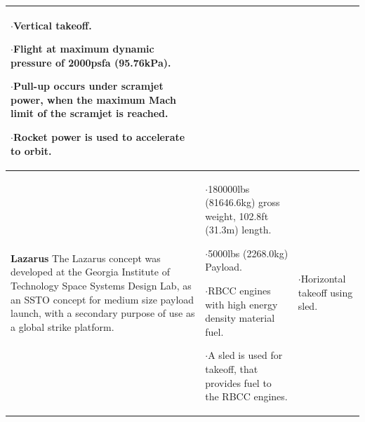 {\begin{landscape}
\begin{xltabular}{\linewidth}{|X|X|X|}
$\cdot$Vertical takeoff. 

$\cdot$Flight at maximum dynamic pressure of 2000psfa (95.76kPa). 

$\cdot$Pull-up occurs under scramjet power, when the maximum Mach limit of the scramjet is reached. 

$\cdot$Rocket power is used to accelerate to orbit. 
 \\
\hline \small\textbf{Lazarus}\cite{Young2006} \newline \newline 
The Lazarus concept was developed at the Georgia Institute of Technology Space Systems Design Lab, as an SSTO concept for medium size payload launch, with a secondary purpose of use as a global strike platform. 

&\small {}  

$\cdot$180000lbs (81646.6kg) gross weight, 102.8ft (31.3m) length. 

$\cdot$5000lbs (2268.0kg) Payload.

$\cdot$RBCC engines with high energy density material fuel. 

$\cdot$A sled is used for takeoff, that provides fuel to the RBCC engines. 

&\small {}

$\cdot$Horizontal takeoff using sled.


\end{xltabular}
\end{landscape}}
